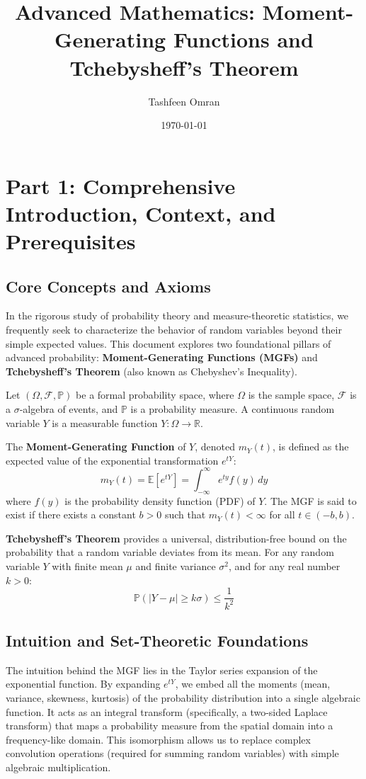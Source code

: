 \documentclass[11pt, a4paper]{article}
\title{Advanced Mathematics: Moment-Generating Functions and Tchebysheff's Theorem}
\author{Tashfeen Omran}
\date{\today}
\theoremstyle{definition}
\theoremstyle{remark}
\newcommand{\R}{\mathbb{R}}
\newcommand{\E}{\mathbb{E}}
\newcommand{\Prob}{\mathbb{P}}
\newcommand{\F}{\mathcal{F}}
\begin{document}
\maketitle
\tableofcontents
\newpage

\section{Part 1: Comprehensive Introduction, Context, and Prerequisites}

\subsection{Core Concepts and Axioms}
In the rigorous study of probability theory and measure-theoretic statistics, we frequently seek to characterize the behavior of random variables beyond their simple expected values. This document explores two foundational pillars of advanced probability: \textbf{Moment-Generating Functions (MGFs)} and \textbf{Tchebysheff's Theorem} (also known as Chebyshev's Inequality). 

Let $(\Omega, \F, \Prob)$ be a formal probability space, where $\Omega$ is the sample space, $\F$ is a $\sigma$-algebra of events, and $\Prob$ is a probability measure. A continuous random variable $Y$ is a measurable function $Y: \Omega \to \R$. 

The \textbf{Moment-Generating Function} of $Y$, denoted $m_Y(t)$, is defined as the expected value of the exponential transformation $e^{tY}$:
\[ m_Y(t) = \E[e^{tY}] = \int_{-\infty}^{\infty} e^{ty} f(y) \, dy \]
where $f(y)$ is the probability density function (PDF) of $Y$. The MGF is said to exist if there exists a constant $b > 0$ such that $m_Y(t) < \infty$ for all $t \in (-b, b)$. 

\textbf{Tchebysheff's Theorem} provides a universal, distribution-free bound on the probability that a random variable deviates from its mean. For any random variable $Y$ with finite mean $\mu$ and finite variance $\sigma^2$, and for any real number $k > 0$:
\[ \Prob(|Y - \mu| \ge k\sigma) \le \frac{1}{k^2} \]

\subsection{Intuition and Set-Theoretic Foundations}
The intuition behind the MGF lies in the Taylor series expansion of the exponential function. By expanding $e^{tY}$, we embed all the moments (mean, variance, skewness, kurtosis) of the probability distribution into a single algebraic function. It acts as an integral transform (specifically, a two-sided Laplace transform) that maps a probability measure from the spatial domain into a frequency-like domain. This isomorphism allows us to replace complex convolution operations (required for summing random variables) with simple algebraic multiplication.
\end{document}
